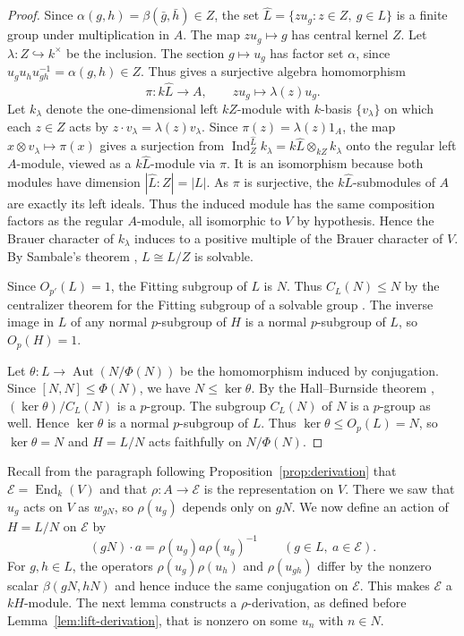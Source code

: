 \documentclass[11pt,a4paper]{article}
\theoremstyle{definition}
\theoremstyle{remark}
\numberwithin{equation}{section}
\DeclareMathOperator{\Aut}{Aut}
\DeclareMathOperator{\End}{End}
\begin{document}
	\begin{proof}
		Since $\alpha(g,h)=\beta(\bar g,\bar h)\in Z$, the set
		$\widehat L=\{zu_g:z\in Z,\ g\in L\}$ is a finite group under
		multiplication in $A$. The map $zu_g\mapsto g$ has central kernel $Z$.
		Let $\lambda:Z\hookrightarrow k^\times$ be the inclusion. The section
		$g\mapsto u_g$ has factor set $\alpha$, since
		$u_gu_hu_{gh}^{-1}=\alpha(g,h)\in Z$. Thus
		\cite[Proposition~1.2.17]{Linckelmann2018a} gives a surjective algebra homomorphism
		\[
		\pi:k\widehat L\longrightarrow A,\qquad zu_g\longmapsto\lambda(z)u_g.
		\]
		Let $k_\lambda$ denote the one-dimensional left $kZ$-module with
		$k$-basis $\{v_\lambda\}$ on which each $z\in Z$ acts by
		$z\cdot v_\lambda=\lambda(z)v_\lambda$.
		Since $\pi(z)=\lambda(z)1_A$, the map $x\otimes v_\lambda\mapsto\pi(x)$
		gives a surjection from $\operatorname{Ind}_Z^{\widehat L}k_\lambda
		=k\widehat L\otimes_{kZ}k_\lambda$ onto the regular left $A$-module,
		viewed as a $k\widehat L$-module via $\pi$. It is an isomorphism
		because both modules have dimension $|\widehat L:Z|=|L|$.
		As $\pi$ is surjective, the $k\widehat L$-submodules of $A$ are exactly
		its left ideals. Thus the induced module has the same composition factors
		as the regular $A$-module, all isomorphic to $V$ by hypothesis.
		Hence the Brauer character of
		$k_\lambda$ induces to a positive multiple of the Brauer character of
		$V$. By Sambale's theorem \cite[Theorem~1]{Sambale2024}, $L\cong\widehat L/Z$ is solvable.
		
		Since $O_{p'}(L)=1$, the Fitting subgroup of $L$ is $N$. Thus
		$C_L(N)\leq N$ by the centralizer theorem for the Fitting subgroup of a
		solvable group \cite[Theorem~9.8]{Isaacs2008}.
		The inverse image in $L$ of any normal $p$-subgroup of $H$ is a normal
		$p$-subgroup of $L$, so $O_p(H)=1$.
		
		Let $\theta:L\to\Aut(N/\Phi(N))$ be the homomorphism induced by
		conjugation. Since $[N,N]\leq\Phi(N)$, we have $N\leq\ker\theta$.
		By the Hall--Burnside theorem \cite[Theorem~2.30]{Craven2008},
		$(\ker\theta)/C_L(N)$ is a $p$-group. The subgroup $C_L(N)$ of $N$
		is a $p$-group as well. Hence $\ker\theta$ is a normal $p$-subgroup of $L$.
		Thus $\ker\theta\leq O_p(L)=N$, so $\ker\theta=N$ and $H=L/N$
		acts faithfully on $N/\Phi(N)$.
	\end{proof}
	
	Recall from the paragraph following Proposition~\ref{prop:derivation}
	that $\mathcal{E}=\End_k(V)$ and that $\rho:A\to \mathcal{E}$ is the representation on $V$.
	There we saw that $u_g$ acts on $V$ as $w_{gN}$, so $\rho(u_g)$ depends
	only on $gN$. We now define an action of $H=L/N$ on $\mathcal{E}$ by
	\[
	(gN)\cdot a=\rho(u_g)a\rho(u_g)^{-1}\qquad(g\in L,\ a\in \mathcal{E}).
	\]
	For $g,h\in L$, the operators $\rho(u_g)\rho(u_h)$ and $\rho(u_{gh})$
	differ by the nonzero scalar $\beta(gN,hN)$ and hence induce the same
	conjugation on $\mathcal{E}$. This makes $\mathcal{E}$ a $kH$-module.
	The next lemma constructs a $\rho$-derivation, as defined before
	Lemma~\ref{lem:lift-derivation}, that is nonzero on some $u_n$ with $n\in N$.
	
\end{document}
